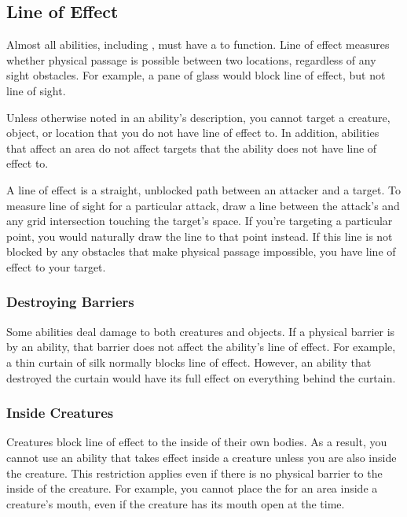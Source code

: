   \subsection{Line of Effect}\label{Line of Effect}
    Almost all abilities, including , must have a  to function.
    Line of effect measures whether physical passage is possible between two locations, regardless of any sight obstacles.
    For example, a pane of glass would block line of effect, but not line of sight.

    Unless otherwise noted in an ability's description, you cannot target a creature, object, or location that you do not have line of effect to.
    In addition, abilities that affect an area do not affect targets that the ability does not have line of effect to.

    A line of effect is a straight, unblocked path between an attacker and a target.
    To measure line of sight for a particular attack, draw a line between the attack's  and any grid intersection touching the target's space.
    If you're targeting a particular point, you would naturally draw the line to that point instead.
    If this line is not blocked by any obstacles that make physical passage impossible, you have line of effect to your target.

    \subsubsection{Destroying Barriers}\label{Destroying Barriers}
      Some abilities deal damage to both creatures and objects.
      If a physical barrier is  by an ability, that barrier does not affect the ability's line of effect.
      For example, a thin curtain of silk normally blocks line of effect.
      However, an ability that destroyed the curtain would have its full effect on everything behind the curtain.

    \subsubsection{Inside Creatures}
      Creatures block line of effect to the inside of their own bodies.
      As a result, you cannot use an ability that takes effect inside a creature unless you are also inside the creature.
      This restriction applies even if there is no physical barrier to the inside of the creature.
      For example, you cannot place the  for an area inside a creature's mouth, even if the creature has its mouth open at the time.

